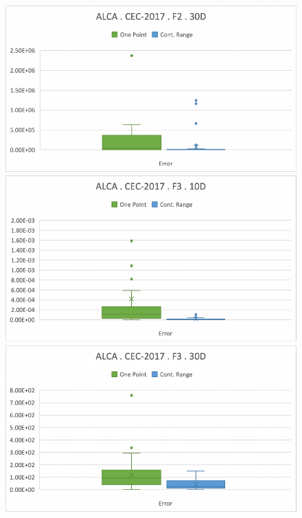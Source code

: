 \documentclass[graybox]{svmult}
\begin{document}
\begin{figure}[!ht]
\begin{minipage}[h]{0.49\linewidth}
        \end{minipage}
        \hfill
        \begin{minipage}[h]{0.49\linewidth}
            \includegraphics[width=1\linewidth]{img/fig_experiment_F2x30D.pdf} 
        \end{minipage}
        \vfill
        \vspace{0.05 cm}
        \begin{minipage}[h]{0.49\linewidth}
            \includegraphics[width=1\linewidth]{img/fig_experiment_F3x10D.pdf} 
        \end{minipage}
        \hfill
        \begin{minipage}[h]{0.49\linewidth}
            \includegraphics[width=1\linewidth]{img/fig_experiment_F3x30D.pdf} 

\end{minipage}
\end{figure}
\end{document}
